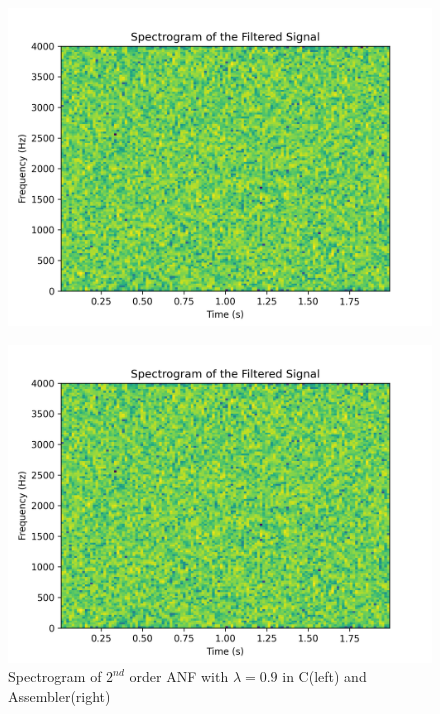 \begin{figure}[ht]
    \centering
    \begin{minipage}{0.475\columnwidth}
        \includegraphics[width=\linewidth]{images/spectrogram_output_a_9.png}
        \label{fig:adaptive_assy_spectrogram_l9}
    \end{minipage}\hfill
    \begin{minipage}{0.475\columnwidth}
        \includegraphics[width=\linewidth]{images/spectrogram_output_c_9.png}
    \end{minipage}\hfill
    \caption{Spectrogram of $2^{nd}$ order ANF with $\lambda = 0.9$ in C(left) and Assembler(right)}
    \label{fig:adaptive_c_spectrogram_l9}
\end{figure}



